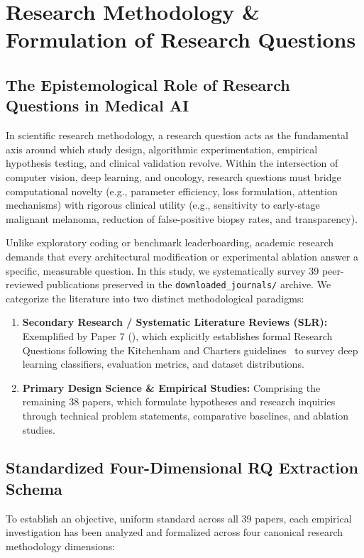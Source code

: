 \section{Research Methodology \& Formulation of Research Questions}
\label{sec:methodology}

\subsection{The Epistemological Role of Research Questions in Medical AI}
In scientific research methodology, a research question acts as the fundamental axis around which study design, algorithmic experimentation, empirical hypothesis testing, and clinical validation revolve. Within the intersection of computer vision, deep learning, and oncology, research questions must bridge computational novelty (e.g., parameter efficiency, loss formulation, attention mechanisms) with rigorous clinical utility (e.g., sensitivity to early-stage malignant melanoma, reduction of false-positive biopsy rates, and transparency).

Unlike exploratory coding or benchmark leaderboarding, academic research demands that every architectural modification or experimental ablation answer a specific, measurable question. In this study, we systematically survey 39 peer-reviewed publications preserved in the \texttt{downloaded\_journals/} archive. We categorize the literature into two distinct methodological paradigms:
\begin{enumerate}[leftmargin=*]
    \item \textbf{Secondary Research / Systematic Literature Reviews (SLR):} Exemplified by Paper 7 (\cite{9113301}), which explicitly establishes formal Research Questions following the Kitchenham and Charters guidelines~\cite{kitchenham2007} to survey deep learning classifiers, evaluation metrics, and dataset distributions.
    \item \textbf{Primary Design Science \& Empirical Studies:} Comprising the remaining 38 papers, which formulate hypotheses and research inquiries through technical problem statements, comparative baselines, and ablation studies.
\end{enumerate}

\subsection{Standardized Four-Dimensional RQ Extraction Schema}
To establish an objective, uniform standard across all 39 papers, each empirical investigation has been analyzed and formalized across four canonical research methodology dimensions:

